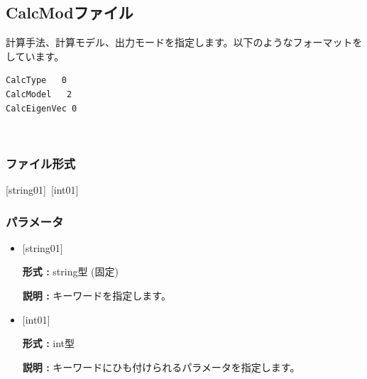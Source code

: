 \newpage
\subsection{CalcModファイル}
\label{Subsec:calcmod}
計算手法、計算モデル、出力モードを指定します。以下のようなフォーマットをしています。\\
\begin{minipage}{10cm}
\begin{screen}
\begin{verbatim}
CalcType   0
CalcModel   2
CalcEigenVec 0
\end{verbatim}
\end{screen}
\end{minipage}
\\
\subsubsection{ファイル形式}
[string01]~[int01]
\subsubsection{パラメータ}
 \begin{itemize}
   \item  $[$string01$]$
   
   {\bf 形式 :} string型 (固定)
   
   {\bf 説明 :} キーワードを指定します。
   
   \item  $[$int01$]$
   
    {\bf 形式 :} int型 

   {\bf 説明 :} キーワードにひも付けられるパラメータを指定します。\\

   
  \end{itemize}

